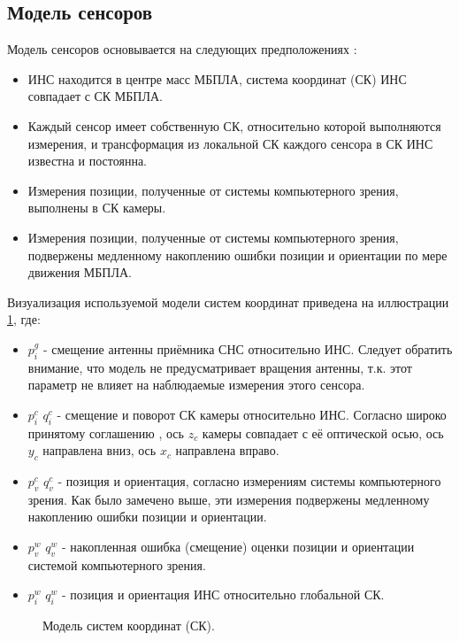 \documentclass[12pt,a4paper]{article}
\begin{document}
\subsection{Модель сенсоров}

Модель сенсоров основывается на следующих предположениях \cite{weiss2012vision}:

\begin{itemize}
    \item ИНС находится в центре масс МБПЛА, система координат (СК) ИНС совпадает с СК МБПЛА.
    \item Каждый сенсор имеет собственную СК, относительно которой выполняются измерения, и трансформация из локальной СК каждого сенсора в СК ИНС известна и постоянна.
    \item Измерения позиции, полученные от системы компьютерного зрения, выполнены в СК камеры.
    \item Измерения позиции, полученные от системы компьютерного зрения, подвержены медленному накоплению ошибки позиции и ориентации по мере движения МБПЛА.
\end{itemize}

Визуализация используемой модели систем координат приведена на иллюстрации \ref{fig:frames}, где:

\begin{itemize}
    \item $p_i^g$ - смещение антенны приёмника СНС относительно ИНС. Следует обратить внимание, что модель не предусматривает вращения антенны, т.к. этот параметр не влияет на наблюдаемые измерения этого сенсора.
    \item $p_i^c$ $q_i^c$ - смещение и поворот СК камеры относительно ИНС. Согласно широко принятому соглашению \cite{ROSFrames}, ось $z_c$ камеры совпадает с её оптической осью, ось $y_c$ направлена вниз, ось $x_c$ направлена вправо.
    \item $p_v^c$ $q_v^c$ - позиция и ориентация, согласно измерениям системы компьютерного зрения. Как было замечено выше, эти измерения подвержены медленному накоплению ошибки позиции и ориентации.
    \item $p_v^w$ $q_v^w$ - накопленная ошибка (смещение) оценки позиции и ориентации системой компьютерного зрения.
    \item $p_i^w$ $q_i^w$ - позиция и ориентация ИНС относительно глобальной СК.
\end{itemize}

\begin{figure}[!h]
    \centering
    
    \caption{\label{fig:frames}Модель систем координат (СК).}
\end{figure}
\end{document}
